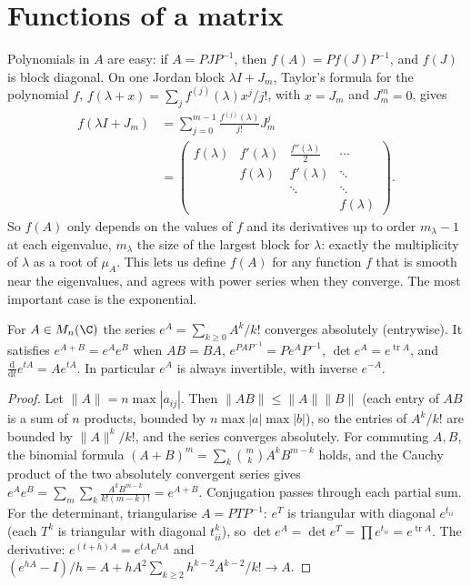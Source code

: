 \section{Functions of a matrix}

Polynomials in $A$ are easy: if $A=PJP^{-1}$, then $f(A)=Pf(J)P^{-1}$, and $f(J)$ is block diagonal. On one Jordan block
$\lambda I+J_m$, Taylor's formula for the polynomial $f$, $f(\lambda+x)=\sum_jf^{(j)}(\lambda)x^j/j!$, with $x=J_m$ and $J_m^m=0$,
gives
\begin{equation}\label{eq:fjordan}
\begin{aligned}
f(\lambda I+J_m)&=\sum_{j=0}^{m-1}\frac{f^{(j)}(\lambda)}{j!}J_m^j\\
&=\begin{pmatrix}f(\lambda)&f'(\lambda)&\frac{f''(\lambda)}2&\cdots\\&f(\lambda)&f'(\lambda)&\ddots\\&&\ddots&\ddots\\&&&f(\lambda)\end{pmatrix}.
\end{aligned}
\end{equation}
So $f(A)$ only depends on the values of $f$ and its derivatives up to order $m_\lambda-1$ at each eigenvalue, $m_\lambda$ the size
of the largest block for $\lambda$: exactly the multiplicity of $\lambda$ as a root of $\mu_A$. This lets us define $f(A)$ for
any function $f$ that is smooth near the eigenvalues, and agrees with power series when they converge. The most
important case is the exponential.

\begin{proposition}\label{prop:exp}
For $A\in M_n(\C)$ the series $e^A=\sum_{k\ge0}A^k/k!$ converges absolutely (entrywise). It satisfies $e^{A+B}=e^Ae^B$ when
$AB=BA$, $e^{PAP^{-1}}=Pe^AP^{-1}$, $\det e^A=e^{\operatorname{tr}A}$, and $\frac{\mathrm d}{\mathrm dt}e^{tA}=Ae^{tA}$. In
particular $e^A$ is always invertible, with inverse $e^{-A}$.
\end{proposition}
\begin{proof}
Let $\|A\|=n\max|a_{ij}|$. Then $\|AB\|\le\|A\|\|B\|$ (each entry of $AB$ is a sum of $n$ products, bounded by
$n\max|a|\max|b|$), so the entries of $A^k/k!$ are bounded by $\|A\|^k/k!$, and the series converges absolutely. For
commuting $A,B$, the binomial formula $(A+B)^m=\sum_k\binom mkA^kB^{m-k}$ holds, and the Cauchy product of the two absolutely
convergent series gives $e^Ae^B=\sum_m\sum_{k}\frac{A^kB^{m-k}}{k!(m-k)!}=e^{A+B}$. Conjugation passes through each partial
sum. For the determinant, triangularise $A=PTP^{-1}$: $e^T$ is triangular with diagonal $e^{t_{ii}}$ (each $T^k$ is triangular
with diagonal $t_{ii}^k$), so $\det e^A=\det e^T=\prod e^{t_{ii}}=e^{\operatorname{tr}A}$. The derivative: $e^{(t+h)A}=e^{tA}e^{hA}$
and $(e^{hA}-I)/h=A+hA^2\sum_{k\ge2}h^{k-2}A^{k-2}/k!\to A$.
\end{proof}

